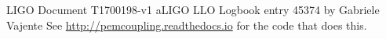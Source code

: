 \documentclass[colorlinks=true,pdfstartview=FitV,linkcolor=blue,
            citecolor=red,urlcolor=magenta]{ligodoc}
\begin{document}
\begin{thebibliography}{3}
 LIGO Document T1700198-v1
 aLIGO LLO Logbook entry 45374 by Gabriele Vajente
 See \url{http://pemcoupling.readthedocs.io} for the code that does this.
\end{thebibliography}
\end{document}
